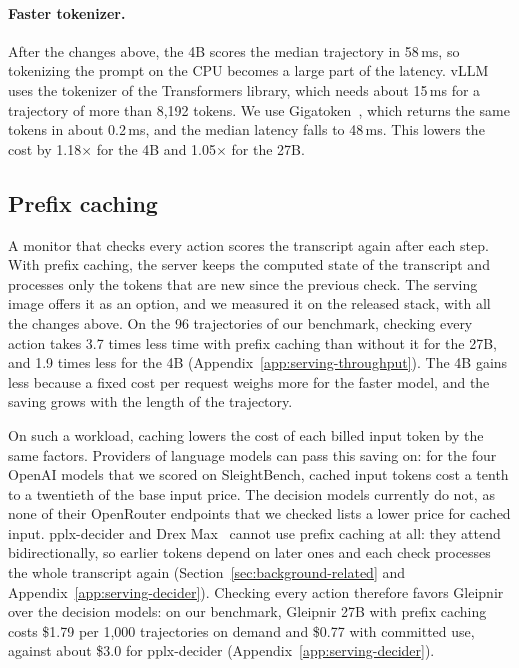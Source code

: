 \paragraph{Faster tokenizer.}
After the changes above, the 4B scores the median trajectory in 58\,ms, so tokenizing the prompt on the CPU becomes a large part of the latency.
vLLM uses the tokenizer of the Transformers library, which needs about 15\,ms for a trajectory of more than 8,192 tokens.
We use Gigatoken~\citep{roed2026gigatoken}, which returns the same tokens in about 0.2\,ms, and the median latency falls to 48\,ms.
This lowers the cost by 1.18$\times$ for the 4B and 1.05$\times$ for the 27B.

\subsection{Prefix caching}
\label{sec:serving-caching}

A monitor that checks every action scores the transcript again after each step.
With prefix caching, the server keeps the computed state of the transcript and processes only the tokens that are new since the previous check.
The serving image offers it as an option, and we measured it on the released stack, with all the changes above.
On the 96 trajectories of our benchmark, checking every action takes 3.7 times less time with prefix caching than without it for the 27B, and 1.9 times less for the 4B (Appendix~\ref{app:serving-throughput}).
The 4B gains less because a fixed cost per request weighs more for the faster model, and the saving grows with the length of the trajectory.

On such a workload, caching lowers the cost of each billed input token by the same factors.
Providers of language models can pass this saving on: for the four OpenAI models that we scored on SleightBench, cached input tokens cost a tenth to a twentieth of the base input price.
The decision models currently do not, as none of their OpenRouter endpoints that we checked lists a lower price for cached input.
pplx-decider and Drex Max~\citep{dhankhar2026drex} cannot use prefix caching at all: they attend bidirectionally, so earlier tokens depend on later ones and each check processes the whole transcript again (Section~\ref{sec:background-related} and Appendix~\ref{app:serving-decider}).
Checking every action therefore favors Gleipnir over the decision models: on our benchmark, Gleipnir 27B with prefix caching costs \$1.79 per 1,000 trajectories on demand and \$0.77 with committed use, against about \$3.0 for pplx-decider (Appendix~\ref{app:serving-decider}).
